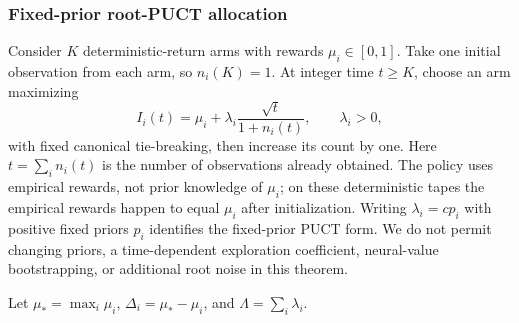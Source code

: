\documentclass{article}
\theoremstyle{plain}
\theoremstyle{definition}
\begin{document}
\subsubsection{Fixed-prior root-PUCT allocation}
\label{sec:v2puctcounts}
Consider $K$ deterministic-return arms with rewards $\mu_i\in[0,1]$.
Take one initial observation from each arm, so $n_i(K)=1$. At integer
time $t\ge K$, choose an arm maximizing
\begin{equation}
 I_i(t)=\mu_i+\lambda_i\frac{\sqrt t}{1+n_i(t)},\qquad \lambda_i>0,
 \label{eq:v2puct}
\end{equation}
with fixed canonical tie-breaking, then increase its count by one.
Here $t=\sum_i n_i(t)$ is the number of observations already obtained.
The policy uses empirical rewards, not prior knowledge of $\mu_i$;
on these deterministic tapes the empirical rewards happen to equal
$\mu_i$ after initialization. Writing $\lambda_i=c p_i$ with positive
fixed priors $p_i$ identifies the fixed-prior PUCT form. We do not permit
changing priors, a time-dependent exploration coefficient, neural-value
bootstrapping, or additional root noise in this theorem.

Let $\mu_* =\max_i\mu_i$, $\Delta_i=\mu_*-\mu_i$, and
$\Lambda=\sum_i\lambda_i$.
\end{document}
